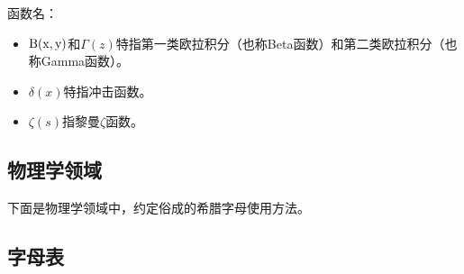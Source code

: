 函数名：

\begin{itemize}
\item ${\rm B(x,y)}$和${\Gamma (z)}$特指第一类欧拉积分（也称Beta函数）和第二类欧拉积分（也称Gamma函数）。
\item $\delta(x)$特指冲击函数。
\item $\zeta(s)$指黎曼$\zeta$函数。
\end{itemize}

\subsection{物理学领域}

下面是物理学领域中，约定俗成的希腊字母使用方法。

\subsection{字母表}

